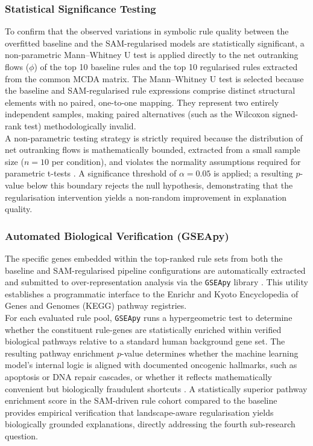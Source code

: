 \subsubsection{Statistical Significance Testing}
\label{subsec:statsig}
To confirm that the observed variations in symbolic rule quality between the overfitted 
baseline and the SAM-regularised models are statistically significant, a non-parametric 
Mann--Whitney U test is applied directly to the net outranking flows ($\phi$) of the 
top 10 baseline rules and the top 10 regularised rules extracted from the common MCDA 
matrix. The Mann--Whitney U test is selected because the baseline and SAM-regularised 
rule expressions comprise distinct structural elements with no paired, one-to-one mapping. 
They represent two entirely independent samples, making paired alternatives (such as the 
Wilcoxon signed-rank test) methodologically invalid. 
\\
A non-parametric testing strategy is strictly required because the distribution of net 
outranking flows is mathematically bounded, extracted from a small sample size ($n=10$ 
per condition), and violates the normality assumptions required for parametric t-tests 
\cite{Derrac2011}. A significance threshold of $\alpha = 0.05$ is applied; a resulting 
$p$-value below this boundary rejects the null hypothesis, demonstrating that the 
regularisation intervention yields a non-random improvement in explanation quality.

\subsubsection{Automated Biological Verification (GSEApy)}
\label{ssub:method_gsea}
The specific genes embedded within the top-ranked rule sets from both the baseline 
and SAM-regularised pipeline configurations are automatically extracted and submitted 
to over-representation analysis via the \texttt{GSEApy} library \cite{Fang2023}. This 
utility establishes a programmatic interface to the Enrichr and Kyoto Encyclopedia of 
Genes and Genomes (KEGG) pathway registries. 
\\
For each evaluated rule pool, \texttt{GSEApy} runs a hypergeometric test to determine 
whether the constituent rule-genes are statistically enriched within verified biological 
pathways relative to a standard human background gene set. The resulting pathway 
enrichment $p$-value determines whether the machine learning model's internal logic is 
aligned with documented oncogenic hallmarks, such as apoptosis or DNA repair cascades, 
or whether it reflects mathematically convenient but biologically fraudulent shortcuts 
\cite{Subramanian2005}. A statistically superior pathway enrichment score in the 
SAM-driven rule cohort compared to the baseline provides empirical verification that 
landscape-aware regularisation yields biologically grounded explanations, directly 
addressing the fourth sub-research question.

